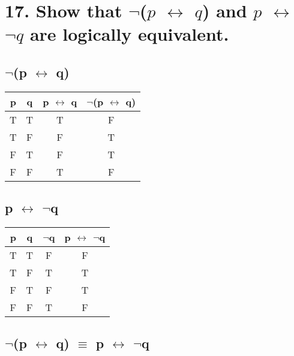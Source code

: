 \documentclass[11pt, oneside]{article} %
\numberwithin{equation}{section} %
\numberwithin{figure}{section} %
\numberwithin{table}{section} %
\begin{document}
\begin{table}[!htp]
\section{17. Show that $\neg$($p$ $\leftrightarrow$ $q$) and $p$ $\leftrightarrow$ $\neg$$q$ are logically equivalent.}
\subsection{$\neg$(p $\leftrightarrow$ q)}
\begin{tabular}{c c c c}
\hline\hline
p & q & p $\leftrightarrow$ q & $\neg$(p $\leftrightarrow$ q) \\ [0.5ex] %
\hline
T & T & T & F\\
T & F & F & T\\
F & T & F & T\\
F & F & T & F\\ [1ex]
\hline
\end{tabular}
\label{table:nonlin}
\end{table}

\begin{table}[!htp]
\subsection{p $\leftrightarrow$ $\neg$q}
\begin{tabular}{c c c c}
\hline\hline
p & q & $\neg$q & p $\leftrightarrow$ $\neg$q \\ [0.5ex] %
\hline
T & T & F & F\\
T & F & T & T\\
F & T & F & T\\
F & F & T & F\\ [1ex]
\hline
\end{tabular}
\label{table:nonlin}
\subsection{$\neg$(p $\leftrightarrow$ q) $\equiv$ p $\leftrightarrow$ $\neg$q}
\end{table}

\end{document}
